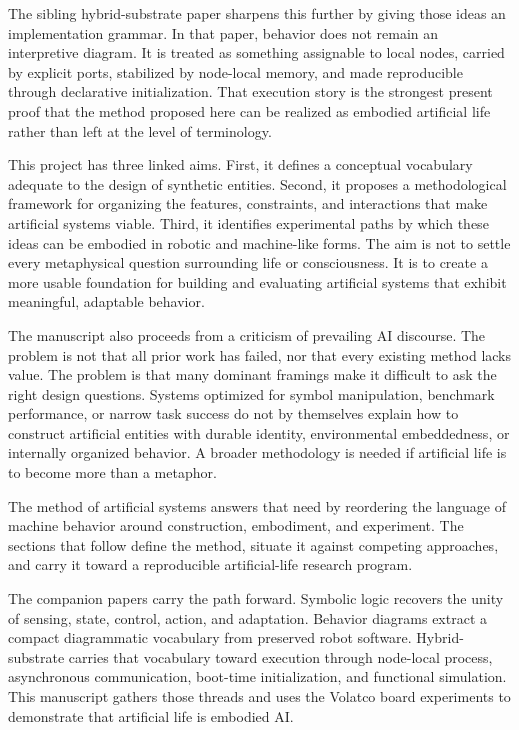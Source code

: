 \documentclass[a4paper,english]{article}
\begin{document}
The sibling hybrid-substrate paper sharpens this further by giving those
ideas an implementation grammar. In that paper, behavior does not remain
an interpretive diagram. It is treated as something assignable to local
nodes, carried by explicit ports, stabilized by node-local memory, and
made reproducible through declarative initialization. That execution
story is the strongest present proof that the method proposed here can
be realized as embodied artificial life rather than left at the level
of terminology.

This project has three linked aims. First, it defines a conceptual
vocabulary adequate to the design of synthetic entities. Second, it
proposes a methodological framework for organizing the features, constraints,
and interactions that make artificial systems viable. Third, it identifies
experimental paths by which these ideas can be embodied in robotic
and machine-like forms. The aim is not to settle every metaphysical
question surrounding life or consciousness. It is to create a more
usable foundation for building and evaluating artificial systems that
exhibit meaningful, adaptable behavior.

The manuscript also proceeds from a criticism of prevailing AI discourse.
The problem is not that all prior work has failed, nor that every
existing method lacks value. The problem is that many dominant framings
make it difficult to ask the right design questions. Systems optimized
for symbol manipulation, benchmark performance, or narrow task success
do not by themselves explain how to construct artificial entities
with durable identity, environmental embeddedness, or internally organized
behavior. A broader methodology is needed if artificial life is to
become more than a metaphor.

The method of artificial systems answers that need by reordering the
language of machine behavior around construction, embodiment, and
experiment. The sections that follow define the method, situate it
against competing approaches, and carry it toward a reproducible
artificial-life research program.

The companion papers carry the path forward. Symbolic logic recovers
the unity of sensing, state, control, action, and adaptation. Behavior diagrams
extract a compact diagrammatic vocabulary from preserved robot
software. Hybrid-substrate carries that vocabulary toward execution
through node-local process, asynchronous communication, boot-time
initialization, and functional simulation. This manuscript gathers
those threads and uses the Volatco board experiments to demonstrate
that artificial life is embodied AI.
\end{document}
